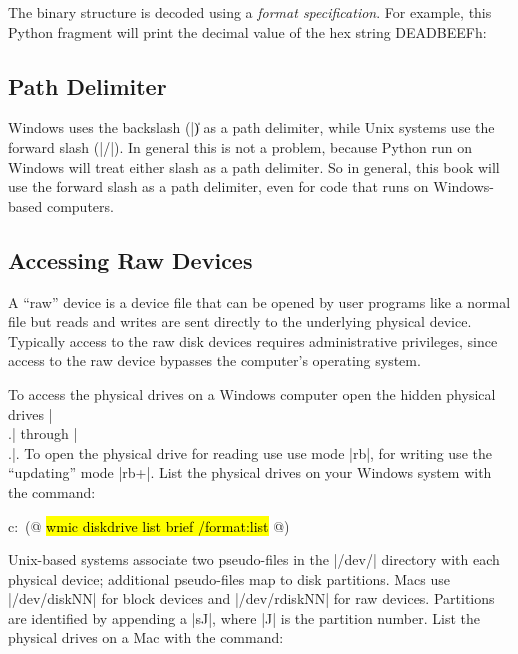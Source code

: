 The binary structure is decoded using a \emph{format
  specification}. For example, this Python fragment will print the
decimal value of the hex string DEADBEEFh:




\subsection{Path Delimiter}
Windows uses the backslash (|\|) as a path delimiter, while Unix
systems use the forward slash (|/|). In general this is not a problem,
because Python run on Windows will treat either slash as a path
delimiter. So in general, this book will use the forward slash as a
path delimiter, even for code that runs on Windows-based computers.

\subsection{Accessing Raw Devices}

A ``raw'' device is a device file that can be opened by user programs
like a normal file but reads and writes are sent directly to the
underlying physical device. Typically access to the raw disk devices 
requires administrative privileges, since access to the raw device
bypasses the computer's operating system.

To access the physical drives on a Windows computer open the hidden
physical drives |\\.| through
|\\.\PhysicalDriveNN|. To open the physical drive for reading use use
mode |rb|, for writing use the ``updating'' mode |rb+|. List the
physical drives on your Windows system with the command:

\begin{code}
c:\ (@ \hl{wmic diskdrive list brief /format:list} @)
\end{code}

Unix-based systems associate two pseudo-files in the |/dev/| directory with
each physical device; additional pseudo-files map to disk
partitions. Macs use |/dev/diskNN| for block devices and
|/dev/rdiskNN| for raw devices. Partitions are identified by appending
a |sJ|, where |J| is the partition number.  List the physical drives
on a Mac with the command:


